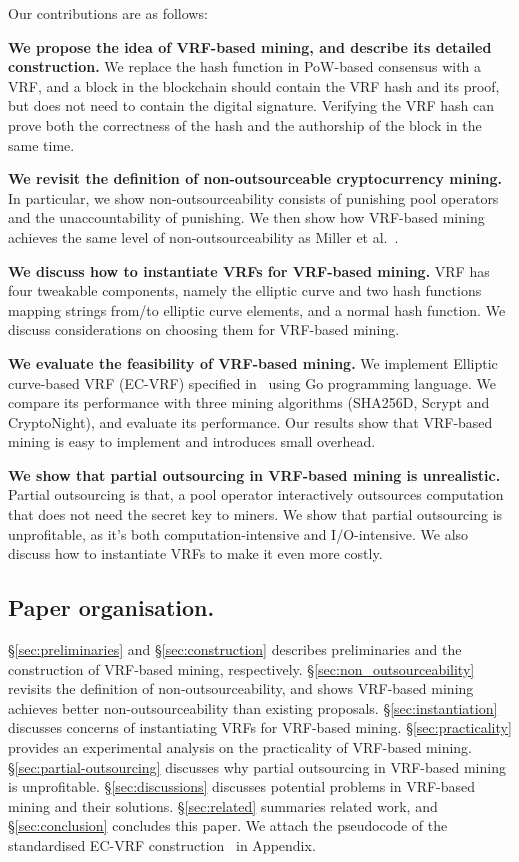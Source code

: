 Our contributions are as follows:

\textbf{We propose the idea of VRF-based mining, and describe its detailed construction.} 
We replace the hash function in PoW-based consensus with a VRF, and a block in the blockchain should contain the VRF hash and its proof, but does not need to contain the digital signature. Verifying the VRF hash can prove both the correctness of the hash and the authorship of the block in the same time.

\textbf{We revisit the definition of non-outsourceable cryptocurrency mining.} In particular, we show non-outsourceability consists of punishing pool operators and the unaccountability of punishing. We then show how VRF-based mining achieves the same level of non-outsourceability as Miller et al.~\cite{miller2015nonoutsourceable}.

\textbf{We discuss how to instantiate VRFs for VRF-based mining.} VRF has four tweakable components, namely the elliptic curve and two hash functions mapping strings from/to elliptic curve elements, and a normal hash function. We discuss considerations on choosing them for VRF-based mining.

\textbf{We evaluate the feasibility of VRF-based mining.} We implement Elliptic curve-based VRF (EC-VRF) specified in~\cite{goldberg2017draft} using Go programming language. We compare its performance with three mining algorithms (SHA256D, Scrypt and CryptoNight), and evaluate its performance. Our results show that VRF-based mining is easy to implement and introduces small overhead.

\textbf{We show that partial outsourcing in VRF-based mining is unrealistic.} Partial outsourcing is that, a pool operator interactively outsources computation that does not need the secret key to miners. We show that partial outsourcing is unprofitable, as it's both computation-intensive and I/O-intensive. We also discuss how to instantiate VRFs to make it even more costly.


\subsection{Paper organisation.}
\S\ref{sec:preliminaries} and \S\ref{sec:construction} describes preliminaries and the construction of VRF-based mining, respectively.
\S\ref{sec:non_outsourceability} revisits the definition of non-outsourceability, and shows VRF-based mining achieves better non-outsourceability than existing proposals.
\S\ref{sec:instantiation} discusses concerns of instantiating VRFs for VRF-based mining.
\S\ref{sec:practicality} provides an experimental analysis on the practicality of VRF-based mining.
\S\ref{sec:partial-outsourcing} discusses why partial outsourcing in VRF-based mining is unprofitable.
\S\ref{sec:discussions} discusses potential problems in VRF-based mining and their solutions.
\S\ref{sec:related} summaries related work, and \S\ref{sec:conclusion} concludes this paper.
We attach the pseudocode of the standardised EC-VRF construction~\cite{goldberg2017draft} in Appendix.
